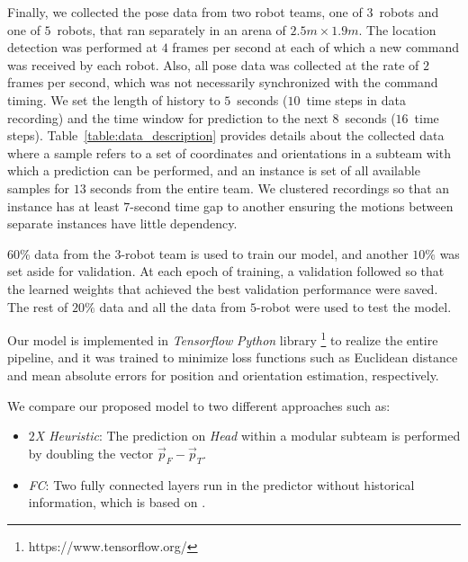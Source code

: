 \documentclass[letterpaper, 10 pt, conference]{ieeeconf}  %
\begin{document}
	Finally, we collected the pose data from two robot teams, one of $3$~robots and one 
	of $5$~robots, that ran separately in an arena of $2.5 m \times 1.9 m$.  
	The location detection was performed at $4$ frames per second at each of
	which a new command was received by each robot. Also, all pose data was 
	collected at the rate of $2$ frames per second, 
	which was not necessarily synchronized with the command timing. 
	We set the length of history to $5$~seconds ($10$~time steps in data recording) and 
	the time window for prediction to the next $8$~seconds ($16$~time steps).  
	Table~\ref{table:data_description} provides details about the collected data
	where a sample refers to a set of coordinates and orientations in a subteam 
	with which a prediction can be performed, and an instance is set of all available samples for $13$ seconds from the entire team. We clustered recordings so that 
	an instance has at least $7$-second time gap to another ensuring
	the motions between separate instances have little dependency. 
	
	$60$\% data from the $3$-robot team is used to train our model, and another $10\%$
	was set aside for validation. At each epoch of training, a validation followed so that
	the learned weights that achieved the best validation performance were saved. 
	The rest of $20\%$ data and all the data from $5$-robot were used to test the model.
	
	Our model is implemented in \emph{Tensorflow} \emph{Python} library \footnote{https://www.tensorflow.org/} 
	to realize the entire pipeline, and it was trained to minimize 
	loss functions such as Euclidean distance and mean absolute errors 
	for position and orientation estimation, respectively.
	
	We compare our proposed model to two different approaches such as: 
	\begin{itemize}
		\item \emph{$2$X Heuristic}: 
		The prediction on \emph{Head} within a modular subteam is performed by doubling the vector 
		$\vec{p}_{F} - \vec{p}_{T}$.
		
		\item \emph{FC}: 
		Two fully connected layers run in the predictor without historical 
		information, which is based on \cite{CPR17}.  
	
	\end{itemize}	

	
\end{document}
